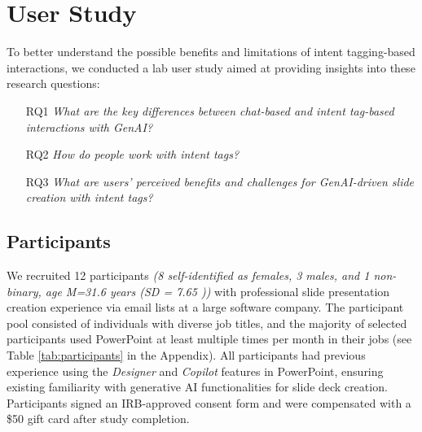 

\section{User Study}
To better understand the possible benefits and limitations of intent tagging-based interactions, we conducted a lab user study aimed at providing insights into these research questions:
\begin{itemize}[font=\bfseries,
  align=left]
    \item[RQ1] \textit{What are the key differences between chat-based and intent tag-based interactions with GenAI?}
    \item[RQ2] \textit{How do people work with intent tags?}
    \item[RQ3] \textit{What are users’ perceived benefits and challenges for GenAI-driven slide creation with intent tags?}
   
 \end{itemize}




\subsection{Participants}
We recruited 12 participants\textit{ (8 self-identified as females, 3 males, and 1 non-binary, age M=31.6 years (SD = 7.65 ))} with professional slide presentation creation experience via email lists at a large software company. The participant pool consisted of individuals with diverse job titles, and the majority of selected participants used PowerPoint at least multiple times per month in their jobs (see Table \ref{tab:participants} in the Appendix). All participants had previous experience using the \textit{Designer} and \textit{Copilot} features in PowerPoint, ensuring existing familiarity with generative AI functionalities for slide deck creation. Participants signed an IRB-approved consent form and were compensated with a \$50 gift card after study completion. 

